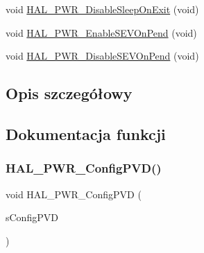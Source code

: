\begin{DoxyCompactItemize}
\item 
void \hyperlink{group___p_w_r___exported___functions___group2_ga1da299e8186a3e08a694865bd41c3bb0}{H\+A\+L\+\_\+\+P\+W\+R\+\_\+\+Disable\+Sleep\+On\+Exit} (void)
\item 
void \hyperlink{group___p_w_r___exported___functions___group2_ga6f33b1c8c8cc85129c68ac302a281033}{H\+A\+L\+\_\+\+P\+W\+R\+\_\+\+Enable\+S\+E\+V\+On\+Pend} (void)
\item 
void \hyperlink{group___p_w_r___exported___functions___group2_ga7811014def9b864dd490a63ada4bab68}{H\+A\+L\+\_\+\+P\+W\+R\+\_\+\+Disable\+S\+E\+V\+On\+Pend} (void)
\end{DoxyCompactItemize}


\subsection{Opis szczegółowy}


\subsection{Dokumentacja funkcji}
\mbox{\label{group___p_w_r___exported___functions___group2_ga87e59191de350b0942847624ddbe6d9d}} 
\subsubsection{\texorpdfstring{H\+A\+L\+\_\+\+P\+W\+R\+\_\+\+Config\+P\+V\+D()}{HAL\_PWR\_ConfigPVD()}}
{\footnotesize\ttfamily void H\+A\+L\+\_\+\+P\+W\+R\+\_\+\+Config\+P\+VD (\begin{DoxyParamCaption}\item[{\hyperlink{struct_p_w_r___p_v_d_type_def}{P\+W\+R\+\_\+\+P\+V\+D\+Type\+Def} $\ast$}]{s\+Config\+P\+VD }\end{DoxyParamCaption})}

\mbox{\label{group___p_w_r___exported___functions___group2_ga3a843cc2fd1a1bb02c7f2dfa355bf9ec}} 
